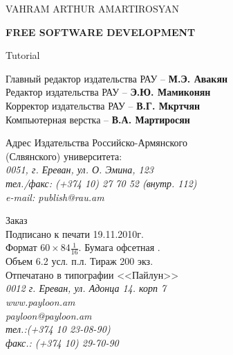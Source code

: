 

\thispagestyle{empty}
\fontsize{15}{15}
\begin{center}
{\large
\bigskip
VAHRAM ARTHUR AMARTIROSYAN

\vskip 70pt

{\bf FREE SOFTWARE DEVELOPMENT}

\vskip 70pt

Tutorial
}
\vskip 70pt
{\large
Главный редактор издательства РАУ -- {\bf М.Э. Авакян }\\
Редактор издательства РАУ -- {\bf Э.Ю. Мамиконян }\\
Корректор издательства РАУ -- {\bf В.Г. Мкртчян }\\
Компьютерная верстка -- {\bf В.А. Мартиросян }\\
}
\bigskip
\bigskip
\bigskip

\linespread{1.0}\normalsize

{\normalsize
Адрес Издательства Российско-Армянского \\(Слвянского) университета: \\
{\em   0051, г. Ереван, ул. О. Эмина, 123 \\
тел./факс: (+374 10) 27 70 52 (внутр. 112) \\
e-mail: publish@rau.am } }


\bigskip
\bigskip
\bigskip



{\normalsize Заказ  \\
Подписано к печати 19.11.2010г. \\
Формат $ 60 \times 84 {\frac 1 {16}} $. Бумага офсетная .\\
Объем 6.2 усл. п.л. Тираж 200 экз.\\
Отпечатано в типографии <<Пайлун>> \\
{\em 0012 г. Ереван, ул. Адонца 14. корп 7 \\
www.payloon.am \\
payloon@payloon.am \\
тел.:(+374 10 23-08-90) \\
факс.: (+374 10) 29-70-90 } }



\end{center}
